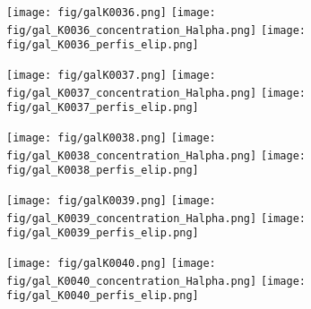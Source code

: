 \begin{figure}[!ht]
\begin{center}
\setcaptionmargin{1cm}
\texttt{[image: fig/galK0036.png]}
\texttt{[image: fig/gal\_K0036\_concentration\_Halpha.png]}
\texttt{[image: fig/gal\_K0036\_perfis\_elip.png]}
\end{center}
\end{figure}


\begin{figure}[!ht]
\begin{center}
\setcaptionmargin{1cm}
\texttt{[image: fig/galK0037.png]}
\texttt{[image: fig/gal\_K0037\_concentration\_Halpha.png]}
\texttt{[image: fig/gal\_K0037\_perfis\_elip.png]}
\end{center}
\end{figure}


\begin{figure}[!ht]
\begin{center}
\setcaptionmargin{1cm}
\texttt{[image: fig/galK0038.png]}
\texttt{[image: fig/gal\_K0038\_concentration\_Halpha.png]}
\texttt{[image: fig/gal\_K0038\_perfis\_elip.png]}
\end{center}
\end{figure}


\begin{figure}[!ht]
\begin{center}
\setcaptionmargin{1cm}
\texttt{[image: fig/galK0039.png]}
\texttt{[image: fig/gal\_K0039\_concentration\_Halpha.png]}
\texttt{[image: fig/gal\_K0039\_perfis\_elip.png]}
\end{center}
\end{figure}


\begin{figure}[!ht]
\begin{center}
\setcaptionmargin{1cm}
\texttt{[image: fig/galK0040.png]}
\texttt{[image: fig/gal\_K0040\_concentration\_Halpha.png]}
\texttt{[image: fig/gal\_K0040\_perfis\_elip.png]}
\end{center}
\end{figure}


